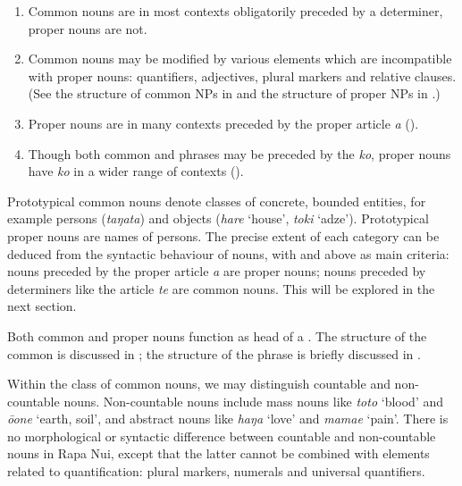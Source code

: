 \begin{enumerate}
\item 
Common nouns are in most contexts obligatorily preceded by a determiner, proper nouns are not. 

\item 
Common nouns may be modified by various elements which are incompatible with proper nouns: quantifiers, adjectives, plural markers and relative clauses. (See the structure of common NPs in  and the structure of proper NPs in .)

\item 
Proper nouns are in many contexts preceded by the proper article \textit{a} ().

\item 
Though both common and  phrases may be preceded by the  \textit{ko}, proper nouns have \textit{ko} in a wider range of contexts ().

\end{enumerate}

Prototypical common nouns denote classes of concrete, bounded entities, for example persons (\textit{taŋata}) and objects (\textit{hare} ‘house’, \textit{toki} ‘adze’). Prototypical proper nouns are names of persons. The precise extent of each category can be deduced from the syntactic behaviour of nouns, with  and  above as main criteria: nouns preceded by the proper article \textit{a} are proper nouns; nouns preceded by determiners like the article \textit{te} are common nouns. This will be explored in the next section.

Both common and proper nouns function as head of a . The structure of the common  is discussed in ; the structure of the  phrase is briefly discussed in .

Within the class of common nouns, we may distinguish countable and non-countable nouns. Non-countable nouns include mass nouns like \textit{toto} ‘blood’ and \textit{{\ꞌ}ō{\ꞌ}one} ‘earth, soil’, and abstract nouns like \textit{haŋa} ‘love’ and \textit{mamae} ‘pain’. There is no morphological or syntactic difference between countable and non-countable nouns in Rapa Nui, except that the latter cannot be combined with  elements related to quantification: plural markers, numerals and universal quantifiers.

